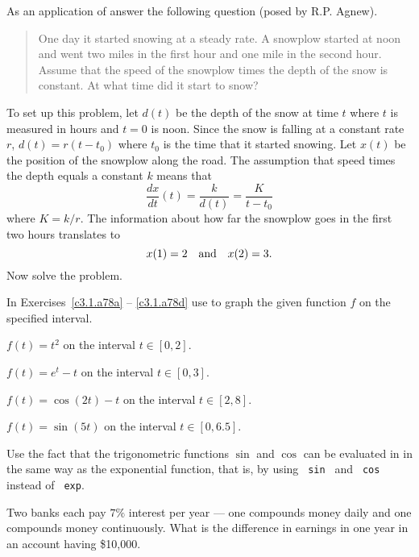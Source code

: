 \documentclass{ximera}
\begin{document}
\begin{exercise} \label{c3.1.7}
As an application of  answer the following question
(posed by R.P. Agnew).
\begin{quote}
One day it started snowing at a steady rate.  A snowplow started at
noon and went two miles in the first hour and one mile in the second
hour.  Assume that the speed of the snowplow times the depth of the
snow is constant.  At what time did it start to snow?
\end{quote}

\noindent To set up this problem, let $d(t)$ be the depth of the snow
at time $t$ where $t$ is measured in hours and $t=0$ is noon.
Since the snow is falling at a constant rate $r$, $d(t)= r(t-t_0)$
where $t_0$ is the time that it started snowing.  Let $x(t)$ be the
position of the snowplow along the road.  The assumption that speed
times the depth equals a constant $k$ means that
\[
\frac{dx}{dt}(t) = \frac{k}{d(t)} = \frac{K}{t-t_0}
\]
where $K=k/r$.  The information about how far the snowplow goes in the
first two hours translates to
\[
x(1) = 2  \quad\mbox{and}\quad x(2) =3.
\]
Now solve the problem.
\end{exercise}


\CEXER

\noindent In Exercises~\ref{c3.1.a78a} -- \ref{c3.1.a78d} use \Matlab
to graph the given function $f$ on the specified interval.
\begin{exercise} \label{c3.1.a78a}
$f(t) = t^2$ on the interval $t\in [0,2]$.
\end{exercise}
\begin{exercise} \label{c3.1.a78b}
$f(t) = e^t-t$ on the interval $t\in [0,3]$.
\end{exercise}
\begin{exercise} \label{c3.1.a78c}
$f(t) = \cos(2t)-t$ on the interval $t\in [2,8]$.
\end{exercise}
\begin{exercise} \label{c3.1.a78d}
$f(t) = \sin(5t)$ on the interval $t\in [0,6.5]$.
\end{exercise}

 Use the fact that the trigonometric functions $\sin$ and
$\cos$ can be evaluated in \Matlab in the same way as the exponential
function, that is, by using \verb+ sin +  and
\verb+ cos +  instead of \verb+ exp+.

\begin{exercise} \label{c3.1.8}
Two banks each pay $7\%$ interest per year --- one compounds money
daily and one compounds money continuously.  What is the difference
in earnings in one year in an account having \$10,000.
\end{exercise}
\end{document}
